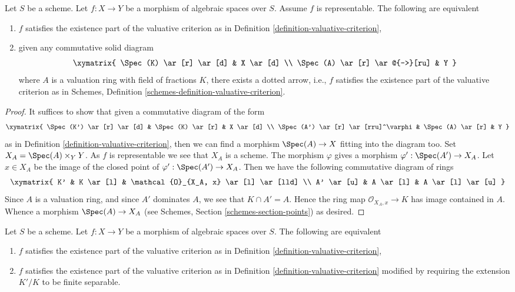 \begin{lemma}
\label{lemma-valuative-criterion-representable}
Let $S$ be a scheme.
Let $f : X \to Y$ be a morphism of algebraic spaces over $S$.
Assume $f$ is representable. The following are equivalent
\begin{enumerate}
\item $f$ satisfies the existence part of the valuative criterion
as in Definition \ref{definition-valuative-criterion},
\item given any commutative solid diagram
$$
\xymatrix{
\Spec(K) \ar[r] \ar[d] & X \ar[d] \\
\Spec(A) \ar[r] \ar@{-->}[ru] & Y
}
$$
where $A$ is a valuation ring with field of fractions $K$, there exists
a dotted arrow, i.e., $f$ satisfies the existence part of the valuative
criterion as in
Schemes, Definition \ref{schemes-definition-valuative-criterion}.
\end{enumerate}
\end{lemma}

\begin{proof}
It suffices to show that given a commutative diagram of the form
$$
\xymatrix{
\Spec(K') \ar[r] \ar[d] & \Spec(K) \ar[r] & X \ar[d] \\
\Spec(A') \ar[r] \ar[rru]^\varphi & \Spec(A) \ar[r] & Y
}
$$
as in Definition \ref{definition-valuative-criterion}, then we can
find a morphism $\Spec(A) \to X$ fitting into the diagram too.
Set $X_A = \Spec(A) \times_Y Y$. As $f$ is representable we see
that $X_A$ is a scheme. The morphism $\varphi$ gives a morphism
$\varphi' : \Spec(A') \to X_A$. Let $x \in X_A$ be the image of
the closed point of $\varphi' : \Spec(A') \to X_A$. Then we
have the following commutative diagram of rings
$$
\xymatrix{
K' & K \ar[l] & \mathcal{O}_{X_A, x} \ar[l] \ar[lld] \\
A' \ar[u] & A \ar[l] & A \ar[l] \ar[u]
}
$$
Since $A$ is a valuation ring, and since $A'$ dominates $A$, we see
that $K \cap A' = A$. Hence the ring map $\mathcal{O}_{X_A, x} \to K$
has image contained in $A$. Whence a morphism $\Spec(A) \to X_A$ (see
Schemes, Section \ref{schemes-section-points})
as desired.
\end{proof}

\begin{lemma}
\label{lemma-finite-separable-enough}
Let $S$ be a scheme.
Let $f : X \to Y$ be a morphism of algebraic spaces over $S$.
The following are equivalent
\begin{enumerate}
\item $f$ satisfies the existence part of the valuative criterion
as in Definition \ref{definition-valuative-criterion},
\item $f$ satisfies the existence part of the valuative criterion
as in Definition \ref{definition-valuative-criterion} modified by
requiring the extension $K'/K$ to be finite separable.
\end{enumerate}
\end{lemma}

